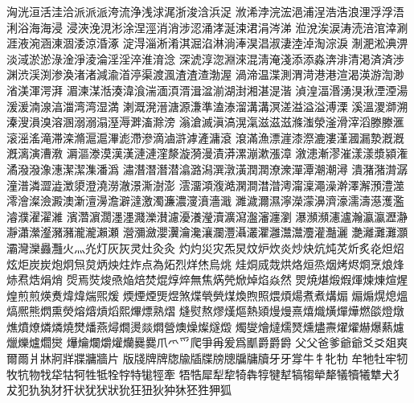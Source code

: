 洶󠄀洸󠄀洹󠄀活󠄀洼󠄀洽󠄀派󠄀派󠄁派󠄂洿󠄀流󠄀浄󠄀浅󠄀浗󠄀浘󠄀浙󠄀浚󠄀浛󠄀浜󠄀浞󠄀
浟󠄀浠󠄀浡󠄀浣󠄀浤󠄀浥󠄀浦󠄀浧󠄀浩󠄀浩󠄁浪󠄀浬󠄀浮󠄀浮󠄁浯󠄀浰󠄀浴󠄀海󠄀海󠄁浸󠄀
浸󠄁浹󠄀浼󠄀涀󠄀涁󠄀涂󠄀涅󠄀涇󠄀消󠄀消󠄁涉󠄀涊󠄀涌󠄀涍󠄀涎󠄀涑󠄀涒󠄀涓󠄀涔󠄀涕󠄀
涖󠄀涗󠄀涘󠄀涙󠄀涛󠄀涜󠄀涪󠄀涫󠄀涬󠄀涮󠄀涯󠄀液󠄀涴󠄀涵󠄀涷󠄀涸󠄀涹󠄀涼󠄀涽󠄀涿󠄀
淀󠄀淂󠄀淄󠄀淅󠄀淆󠄀淇󠄀淈󠄀淊󠄀淋󠄀淌󠄀淎󠄀淏󠄀淐󠄀淑󠄀淒󠄀淕󠄀淖󠄀淘󠄀淙󠄀淚󠄀
淛󠄀淝󠄀淞󠄀淟󠄀淠󠄀淡󠄀淢󠄀淤󠄀淤󠄁淥󠄀淦󠄀淨󠄀淩󠄀淪󠄀淫󠄀淫󠄁淬󠄀淮󠄀淯󠄀淰󠄀
深󠄀淲󠄀淳󠄀淴󠄀淵󠄀淶󠄀混󠄀淸󠄀淹󠄀淺󠄀添󠄀添󠄁淼󠄀渀󠄀渄󠄀清󠄀渇󠄀済󠄀済󠄁渉󠄀
渊󠄀渋󠄀渓󠄀渕󠄀渗󠄀渙󠄀渚󠄀渚󠄁減󠄀渝󠄀渞󠄀渟󠄀渠󠄀渡󠄀渢󠄀渣󠄀渣󠄁渣󠄂渤󠄀渥󠄀
渦󠄀渧󠄀温󠄀渫󠄀測󠄀渭󠄀渮󠄀港󠄀港󠄁渲󠄀渴󠄀渶󠄀游󠄀渹󠄀渺󠄀渻󠄀渼󠄀渾󠄀湂󠄀湃󠄀
湄󠄀湅󠄀湈󠄀湉󠄀湊󠄀湋󠄀湌󠄀湍󠄀湎󠄀湏󠄀湑󠄀湒󠄀湓󠄀湔󠄀湖󠄀湗󠄀湘󠄀湛󠄀湜󠄀湝󠄀
湞󠄀湟󠄀湢󠄀湣󠄀湧󠄀湨󠄀湫󠄀湮󠄀湮󠄁湯󠄀湲󠄀湲󠄁湳󠄀湶󠄀湻󠄀湽󠄀湾󠄀湾󠄁湿󠄀満󠄀
溂󠄀溉󠄀溌󠄀溍󠄀溏󠄀源󠄀溓󠄀準󠄀溘󠄀溙󠄀溜󠄀溝󠄀溝󠄁溟󠄀溠󠄀溢󠄀溢󠄁溢󠄂溥󠄀溧󠄀
溪󠄀溫󠄀溭󠄀溮󠄀溯󠄀溱󠄀溲󠄀溳󠄀溴󠄀溶󠄀溷󠄀溺󠄀溺󠄁溻󠄀溼󠄀溽󠄀溿󠄀滀󠄀滁󠄀滂󠄀
滃󠄀滄󠄀滅󠄀滇󠄀滈󠄀滉󠄀滊󠄀滋󠄀滋󠄁滋󠄂滌󠄀滍󠄀滎󠄀滏󠄀滑󠄀滓󠄀滔󠄀滕󠄀滕󠄁滙󠄀
滚󠄀滛󠄀滛󠄁滝󠄀滞󠄀滦󠄀滫󠄀滬󠄀滬󠄁滭󠄀滮󠄀滯󠄀滲󠄀滴󠄀滷󠄀滸󠄀滹󠄀滻󠄀滽󠄀滾󠄀
滾󠄁滿󠄀漁󠄀漂󠄀漄󠄀漆󠄀漈󠄀漉󠄀漊󠄀漌󠄀漍󠄀漏󠄀漐󠄀漑󠄀漑󠄁漑󠄂漓󠄀演󠄀漕󠄀漖󠄀
漘󠄀漚󠄀漛󠄀漠󠄀漢󠄀漢󠄁漣󠄀漣󠄁漥󠄀漦󠄀漩󠄀漪󠄀漫󠄀漬󠄀漭󠄀漯󠄀漰󠄀漱󠄀漲󠄀漳󠄀
漵󠄀漶󠄀漸󠄀漻󠄀漼󠄀漾󠄀漾󠄁漿󠄀潁󠄀潅󠄀潏󠄀潑󠄀潑󠄁潒󠄀潓󠄀潔󠄀潔󠄁潗󠄀潘󠄀潙󠄀
潚󠄀潛󠄀潛󠄁潛󠄂潜󠄀潝󠄀潞󠄀潟󠄀潠󠄀潡󠄀潢󠄀潤󠄀潤󠄁潦󠄀潨󠄀潬󠄀潭󠄀潮󠄀潮󠄁潯󠄀
潰󠄀潴󠄀潴󠄁潸󠄀潺󠄀潼󠄀潽󠄀潾󠄀澀󠄀澁󠄀澂󠄀澃󠄀澄󠄀澆󠄀澇󠄀澈󠄀澋󠄀澌󠄀澍󠄀澎󠄀
澐󠄀澑󠄀澒󠄀澓󠄀澔󠄀澖󠄀澗󠄀澘󠄀澘󠄁澚󠄀澝󠄀澟󠄀澠󠄀澡󠄀澣󠄀澤󠄀澥󠄀澦󠄀澧󠄀澨󠄀
澪󠄀澮󠄀澯󠄀澰󠄀澱󠄀澳󠄀澵󠄀澶󠄀澷󠄀澹󠄀澼󠄀澾󠄀激󠄀濁󠄀濂󠄀濃󠄀濅󠄀濆󠄀濇󠄀濈󠄀
濉󠄀濊󠄀濔󠄀濕󠄀濘󠄀濚󠄀濛󠄀濞󠄀濟󠄀濠󠄀濡󠄀濤󠄀濨󠄀濩󠄀濫󠄀濬󠄀濮󠄀濯󠄀濯󠄁濰󠄀
濱󠄀濳󠄀濵󠄀濶󠄀濹󠄀濹󠄁濺󠄀濼󠄀濽󠄀濾󠄀瀀󠄀瀁󠄀瀅󠄀瀆󠄀瀇󠄀瀉󠄀瀊󠄀瀋󠄀瀍󠄀瀏󠄀
瀑󠄀瀕󠄀瀕󠄁瀗󠄀瀘󠄀瀚󠄀瀛󠄀瀛󠄁瀝󠄀瀞󠄀瀞󠄁瀟󠄀瀠󠄀瀣󠄀瀦󠄀瀦󠄁瀧󠄀瀧󠄁瀨󠄀瀬󠄀
瀯󠄀瀰󠄀瀲󠄀瀴󠄀瀷󠄀瀹󠄀瀺󠄀瀼󠄀瀾󠄀灃󠄀灄󠄀灇󠄀灈󠄀灉󠄀灊󠄀灊󠄁灋󠄀灌󠄀灎󠄀灑󠄀
灔󠄀灕󠄀灘󠄀灘󠄁灝󠄀灞󠄀灣󠄀灤󠄀灥󠄀灩󠄀火󠄀灬󠄀灮󠄀灯󠄀灰󠄀灰󠄁灵󠄀灶󠄀灸󠄀灸󠄁
灼󠄀灼󠄁災󠄀灾󠄀炁󠄀炅󠄀炆󠄀炉󠄀炊󠄀炎󠄀炒󠄀炔󠄀炕󠄀炖󠄀炗󠄀炘󠄀炙󠄀炛󠄀炟󠄀炤󠄀
炫󠄀炬󠄀炭󠄀炭󠄁炮󠄀炯󠄀炰󠄀炱󠄀炳󠄀炴󠄀炷󠄀炸󠄀点󠄀為󠄀炻󠄀烈󠄀烊󠄀烋󠄀烏󠄀烑󠄀
烓󠄀烔󠄀烕󠄀烖󠄀烘󠄀烙󠄀烜󠄀烝󠄀烟󠄀烤󠄀烬󠄀烱󠄀烹󠄀烺󠄀烽󠄀焃󠄀焄󠄀焅󠄀焆󠄀焇󠄀
焈󠄀焉󠄀焋󠄀焌󠄀焏󠄀焔󠄀焙󠄀焚󠄀焜󠄀焞󠄀焠󠄀無󠄀焦󠄀焫󠄀焭󠄀焮󠄀焯󠄀焰󠄀焱󠄀然󠄀
焸󠄀焼󠄀煁󠄀煅󠄀煆󠄀煇󠄀煉󠄀煉󠄁煊󠄀煋󠄀煌󠄀煎󠄀煎󠄁煐󠄀煑󠄀煒󠄀煒󠄁煓󠄀煕󠄀煖󠄀
煗󠄀煙󠄀煙󠄁煚󠄀煜󠄀煞󠄀煠󠄀煢󠄀煢󠄁煤󠄀煥󠄀煦󠄀照󠄀煨󠄀煩󠄀煬󠄀煮󠄀煮󠄁煹󠄀煽󠄀
煽󠄁煽󠄂熀󠄀熄󠄀熅󠄀熇󠄀熈󠄀熊󠄀熌󠄀熏󠄀熒󠄀熔󠄀熔󠄁熕󠄀熖󠄀熙󠄀熚󠄀熛󠄀熟󠄀熠󠄀
熢󠄀熨󠄀熬󠄀熮󠄀熯󠄀熰󠄀熱󠄀熲󠄀熳󠄀熳󠄁熹󠄀熺󠄀熾󠄀熿󠄀燀󠄀燁󠄀燃󠄀燄󠄀燈󠄀燉󠄀
燋󠄀燌󠄀燎󠄀燐󠄀燐󠄁燒󠄀燓󠄀燔󠄀燕󠄀燖󠄀燗󠄀燙󠄀燚󠄀燜󠄀營󠄀燠󠄀燥󠄀燦󠄀燧󠄀燬󠄀
燭󠄀燮󠄀燴󠄀燵󠄀燸󠄀燹󠄀燻󠄀燼󠄀燾󠄀燿󠄀燿󠄁爀󠄀爆󠄀爇󠄀爈󠄀爉󠄀爍󠄀爐󠄀爓󠄀爕󠄀
爗󠄀爚󠄀爛󠄀爝󠄀爟󠄀爤󠄀爨󠄀爨󠄁爪󠄀爫󠄀爫󠄁爬󠄀爭󠄀爯󠄀爰󠄀爲󠄀爴󠄀爵󠄀爵󠄁爵󠄂
父󠄀父󠄁爸󠄀爹󠄀爺󠄀爺󠄁爻󠄀爻󠄁爼󠄀爽󠄀爾󠄀爾󠄁爿󠄀牀󠄀牁󠄀牂󠄀牃󠄀牅󠄀牆󠄀片󠄀
版󠄀牋󠄀牌󠄀牌󠄁牎󠄀牏󠄀牐󠄀牒󠄀牓󠄀牕󠄀牖󠄀牗󠄀牘󠄀牙󠄀牙󠄁牚󠄀牛󠄀牜󠄀牝󠄀牞󠄀
牟󠄀牠󠄀牡󠄀牢󠄀牣󠄀牧󠄀牨󠄀物󠄀牫󠄀牮󠄀牯󠄀牱󠄀牲󠄀牴󠄀牷󠄀牸󠄀特󠄀牻󠄀牼󠄀牽󠄀
牾󠄀牿󠄀犀󠄀犁󠄀犂󠄀犄󠄀犇󠄀犉󠄀犍󠄀犎󠄀犒󠄀犓󠄀犖󠄀犛󠄀犠󠄀犢󠄀犧󠄀犨󠄀犬󠄀犭󠄀
犮󠄀犯󠄀犰󠄀犱󠄀犲󠄀犴󠄀状󠄀犹󠄀犾󠄀狀󠄀狁󠄀狂󠄀狃󠄀狄󠄀狆󠄀狇󠄀狉󠄀狌󠄀狎󠄀狐󠄀
